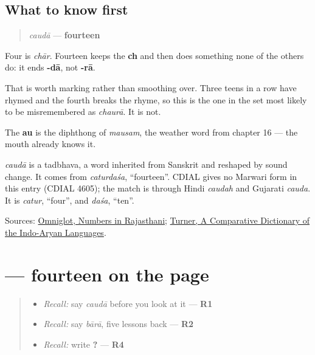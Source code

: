 \subsection*{What to know first}
\begin{quote}
\emph{caudā} — \textbf{fourteen}
\end{quote}

Four is \emph{chār}. Fourteen keeps the \textbf{ch} and then does something none of the others do: it ends \textbf{-dā}, not \textbf{-rā}.

That is worth marking rather than smoothing over. Three teens in a row have rhymed and the fourth breaks the rhyme, so this is the one in the set most likely to be misremembered as \emph{chaurā}. It is not.

The \textbf{au} is the diphthong of \emph{mausam}, the weather word from chapter 16 — the mouth already knows it.

\begin{cousinweb}
\emph{caudā} is a tadbhava, a word inherited from Sanskrit and reshaped by sound change. It comes from \emph{caturdaśa}, \textquotedblleft{}fourteen\textquotedblright{}. CDIAL gives no Marwari form in this entry (CDIAL 4605); the match is through Hindi \emph{caudah} and Gujarati \emph{cauda}. It is \emph{catur}, \textquotedblleft{}four\textquotedblright{}, and \emph{daśa}, \textquotedblleft{}ten\textquotedblright{}.
\end{cousinweb}

\begin{tcolorbox}[breakable,colback=teal!4,colframe=teal!35!black,title={Before you move on}]
Sources: \href{https://www.omniglot.com/language/numbers/rajasthani.htm}{Omniglot, Numbers in Rajasthani}; \href{https://dsal.uchicago.edu/dictionaries/soas/}{Turner, A Comparative Dictionary of the Indo-Aryan Languages}.
\end{tcolorbox}
\section[\texorpdfstring{\mw{चौदा} (caudā)}{चौदा (caudā)}]{ — fourteen on the page}

\label{lesson:MW-C37-chauda}



\begin{quote}
\begin{itemize}
\raggedright
  \item \emph{Recall:} say \emph{caudā} before you look at it — \textbf{R1}
  \item \emph{Recall:} say \emph{bārā}, five lessons back — \textbf{R2}
  \item \emph{Recall:} write \textbf{   ?} — \textbf{R4}
\end{itemize}
\end{quote}

